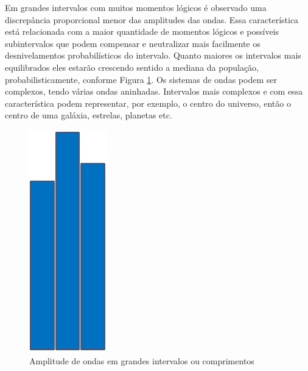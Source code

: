 Em grandes intervalos com muitos momentos lógicos é observado uma discrepância proporcional menor das amplitudes das ondas. Essa característica está relacionada com a maior quantidade de momentos lógicos e possíveis subintervalos que podem compensar e neutralizar mais facilmente os desnivelamentos probabilísticos do intervalo. Quanto maiores os intervalos mais equilibrados eles estarão crescendo sentido a mediana da população, probabilisticamente, conforme Figura \ref{fig:consciousness_space_subconsciousness}. Os sistemas de ondas podem ser complexos, tendo várias ondas aninhadas. Intervalos mais complexos e com essa característica podem representar, por exemplo, o centro do universo, então o centro de uma galáxia, estrelas, planetas etc.
	\begin{figure}[H]
	\caption{Amplitude de ondas em grandes intervalos ou comprimentos}
	\label{fig:consciousness_space_subconsciousness}
	\centering
	\includegraphics[scale=.45]{sections/images/consciousness_space_subconsciousness.jpg}
	\end{figure}

